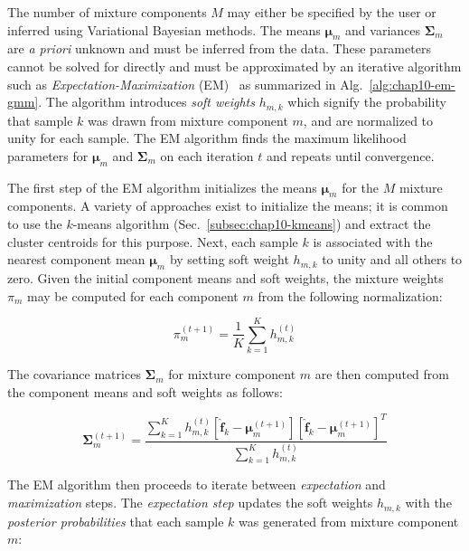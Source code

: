 The number of mixture components $M$ may either be specified by the user or inferred using Variational Bayesian methods. The means $\boldsymbol{\mu}_{m}$ and variances $\boldsymbol{\Sigma}_{m}$ are \textit{a priori} unknown and must be inferred from the data. These parameters cannot be solved for directly and must be approximated by an iterative algorithm such as \textit{Expectation-Maximization} (EM)~\cite{dempster1977em} as summarized in Alg.~\ref{alg:chap10-em-gmm}. The algorithm introduces \textit{soft weights} $h_{m,k}$ which signify the probability that sample $k$ was drawn from mixture component $m$, and are normalized to unity for each sample. The EM algorithm finds the maximum likelihood parameters for $\boldsymbol{\mu}_{m}$ and $\boldsymbol{\Sigma}_{m}$ on each iteration $t$ and repeats until convergence. 

The first step of the EM algorithm initializes the means $\boldsymbol{\mu}_{m}$ for the $M$ mixture components. A variety of approaches exist to initialize the means; it is common to use the $k$-means algorithm (Sec.~\ref{subsec:chap10-kmeans}) and extract the cluster centroids for this purpose. Next, each sample $k$ is associated with the nearest component mean $\boldsymbol{\mu}_{m}$ by setting soft weight $h_{m,k}$ to unity and all others to zero. Given the initial component means and soft weights, the mixture weights $\pi_{m}$ may be computed for each component $m$ from the following normalization:

\begin{equation}
\label{eqn:em-weights}
\pi_{m}^{(t+1)} = \frac{1}{K}\displaystyle\sum\limits_{k=1}^{K} h_{m,k}^{(t)}
\end{equation}

\noindent The covariance matrices $\boldsymbol{\Sigma}_{m}$ for mixture component $m$ are then computed from the component means and soft weights as follows:

\begin{equation}
\label{eqn:em-covariances}
\boldsymbol{\Sigma}_{m}^{(t+1)} = \frac{\displaystyle\sum\limits_{k=1}^{K}h_{m,k}^{(t)}\left[ \boldsymbol{\hat{f}}_{k} - \boldsymbol{\mu}_{m}^{(t+1)}\right]\left[ \boldsymbol{\hat{f}}_{k} - \boldsymbol{\mu}_{m}^{(t+1)}\right]^{T}}{\displaystyle\sum\limits_{k=1}^{K}h_{m,k}^{(t)}}
\end{equation}

The EM algorithm then proceeds to iterate between \textit{expectation} and \textit{maximization} steps. The \textit{expectation step} updates the soft weights $h_{m,k}$ with the \textit{posterior probabilities} that each sample $k$ was generated from mixture component $m$:

